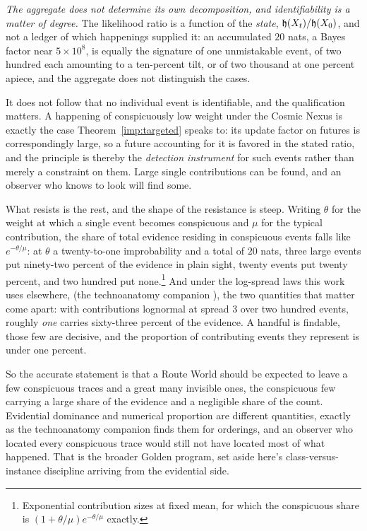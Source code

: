 \emph{The aggregate does not determine its own decomposition, and
identifiability is a matter of degree.} The likelihood ratio is a
function of the \emph{state}, $\mathfrak{h}(X_t)/\mathfrak{h}(X_0)$, and not a ledger of
which happenings supplied it: an accumulated $20$ nats, a Bayes factor
near $5\times10^{8}$, is equally the signature of one unmistakable
event, of two hundred each amounting to a ten-percent tilt, or of two
thousand at one percent apiece, and the aggregate does not distinguish
the cases.

It does not follow that no individual event is identifiable, and the
qualification matters. A happening of conspicuously low weight under the
Cosmic Nexus is exactly the case
Theorem~\ref{imp:targeted} speaks to: its update factor on
futures is correspondingly large, so a future accounting for it is
favored in the stated ratio, and the principle is thereby the
\emph{detection instrument} for such events rather than merely a
constraint on them. Large single contributions can be found, and an
observer who knows to look will find some.

What resists is the rest, and the shape of the resistance is steep.
Writing $\theta$ for the weight at which a single event becomes
conspicuous and $\mu$ for the typical contribution, the share of total
evidence residing in conspicuous events falls like $e^{-\theta/\mu}$: at
$\theta$ a twenty-to-one improbability and a total of $20$ nats, three
large events put ninety-two percent of the evidence in plain sight,
twenty events put twenty percent, and two hundred put
none.\footnote{Exponential contribution sizes at fixed mean, for which
the conspicuous share is $(1+\theta/\mu)e^{-\theta/\mu}$ exactly.} And
under the log-spread laws this work uses elsewhere,
(the technoanatomy companion \cite{GoldenTechnoanatomy}), the two quantities that matter come
apart: with contributions lognormal at spread $3$ over two hundred
events, roughly \emph{one} carries sixty-three percent of the evidence.
A handful is findable, those few are decisive, and the proportion of
contributing events they represent is under one percent.

So the accurate statement is that a Route World should be expected to leave
a few conspicuous traces and a great many invisible ones, the conspicuous
few carrying a large share of the evidence and a negligible share of the
count. Evidential dominance and numerical proportion are different
quantities, exactly as the technoanatomy companion \cite{GoldenTechnoanatomy} finds them for
orderings, and an observer who located every conspicuous trace would
still not have located most of what happened. That is
the broader Golden program, set aside here's class-versus-instance discipline arriving from the
evidential side.

